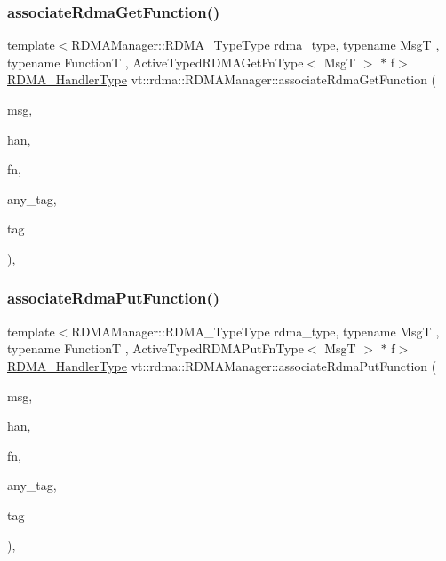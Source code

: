 \subsubsection{\texorpdfstring{associate\+Rdma\+Get\+Function()}{associateRdmaGetFunction()}}
{\footnotesize\ttfamily template$<$R\+D\+M\+A\+Manager\+::\+R\+D\+M\+A\+\_\+\+Type\+Type rdma\+\_\+type, typename MsgT , typename FunctionT , Active\+Typed\+R\+D\+M\+A\+Get\+Fn\+Type$<$ Msg\+T $>$ $\ast$ f$>$ \\
\hyperlink{namespacevt_a9530efb893c0f3846e8ac5f0507e0f49}{R\+D\+M\+A\+\_\+\+Handler\+Type} vt\+::rdma\+::\+R\+D\+M\+A\+Manager\+::associate\+Rdma\+Get\+Function (\begin{DoxyParamCaption}\item[{MsgT $\ast$}]{msg,  }\item[{\hyperlink{namespacevt_a10442579ec4e7ebef223818e64bcf908}{R\+D\+M\+A\+\_\+\+Handle\+Type} const \&}]{han,  }\item[{FunctionT const \&}]{fn,  }\item[{bool const \&}]{any\+\_\+tag,  }\item[{\hyperlink{namespacevt_a84ab281dae04a52a4b243d6bf62d0e52}{Tag\+Type} const \&}]{tag }\end{DoxyParamCaption})\hspace{0.3cm}{\ttfamily [inline]}, {\ttfamily [private]}}

\mbox{\label{structvt_1_1rdma_1_1_r_d_m_a_manager_a08df53322f7811c8a80911506d3db362}} 
\subsubsection{\texorpdfstring{associate\+Rdma\+Put\+Function()}{associateRdmaPutFunction()}}
{\footnotesize\ttfamily template$<$R\+D\+M\+A\+Manager\+::\+R\+D\+M\+A\+\_\+\+Type\+Type rdma\+\_\+type, typename MsgT , typename FunctionT , Active\+Typed\+R\+D\+M\+A\+Put\+Fn\+Type$<$ Msg\+T $>$ $\ast$ f$>$ \\
\hyperlink{namespacevt_a9530efb893c0f3846e8ac5f0507e0f49}{R\+D\+M\+A\+\_\+\+Handler\+Type} vt\+::rdma\+::\+R\+D\+M\+A\+Manager\+::associate\+Rdma\+Put\+Function (\begin{DoxyParamCaption}\item[{MsgT $\ast$}]{msg,  }\item[{\hyperlink{namespacevt_a10442579ec4e7ebef223818e64bcf908}{R\+D\+M\+A\+\_\+\+Handle\+Type} const \&}]{han,  }\item[{FunctionT const \&}]{fn,  }\item[{bool const \&}]{any\+\_\+tag,  }\item[{\hyperlink{namespacevt_a84ab281dae04a52a4b243d6bf62d0e52}{Tag\+Type} const \&}]{tag }\end{DoxyParamCaption})\hspace{0.3cm}{\ttfamily [inline]}, {\ttfamily [private]}}


